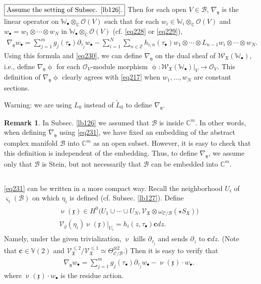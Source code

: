 \documentclass[11pt,b5paper,notitlepage]{article}
\theoremstyle{definition}
\newtheorem{rem}[df]{Remark}
\theoremstyle{plain}
\newcommand{\fk}{\mathfrak}
\newcommand{\mc}{\mathcal}
\newcommand{\wtd}{\widetilde}
\newcommand{\scr}{\mathscr}
\newcommand{\xk}{\mathfrak x}
\newcommand{\yk}{\mathfrak y}
\newcommand{\sgm}{\varsigma}
\newcommand{\SX}{{S_{\fk X}}}
\newcommand{\blt}{\bullet}
\newcommand{\Vbb}{\mathbb V}
\newcommand{\Wbb}{\mathbb W}
\newcommand{\Cbb}{\mathbb C}
\newcommand{\Zbb}{\mathbb Z}
\newcommand{\cbf}{\mathbf c}
\numberwithin{equation}{section}
\begin{document}
\emph{$\boxed{\text{Assume the setting of Subsec. \ref{lb126}.}}$} Then for each open $V\in\mc B$, $\nabla_\yk$ is the linear operator on $\Wbb_\blt\otimes_\Cbb\scr O(V)$ such that for each $w_i\in\Wbb_i\otimes_\Cbb\scr O(V)$ and $w_\blt=w_1\otimes\cdots\otimes w_N$ in $\Wbb_\blt\otimes_\Cbb\scr O(V)$ (cf. \eqref{eq228} or \eqref{eq229}),
\begin{align}
\nabla_\yk w_\blt=\sum_{j=1}^m  g_j(\tau_\blt)\partial_{\tau_j} w_\blt-\sum_{i=1}^N\sum_{n\in\Zbb}h_{i,n}(\tau_\blt)w_1\otimes\cdots\otimes L_{n-1}w_i\otimes\cdots\otimes w_N.\label{eq231}
\end{align}
Using this formula and \eqref{eq230}, we can define $\nabla_\yk$ on the dual sheaf of $\scr W_{\fk X}(\Wbb_\blt)$, i.e., define $\nabla_\yk\upphi$ for each $\scr O_V$-module morphism $\upphi:\scr W_{\fk X}(\Wbb_\blt)|_V\rightarrow\scr O_V$. This definition of $\nabla_\yk\upphi$ clearly agrees with \eqref{eq217} when $w_1,\dots,w_N$ are constant sections.

Warning: we are using $L_0$ instead of $\wtd L_0$ to define $\nabla_\yk$.

\begin{rem}
In Subsec. \ref{lb126} we assumed that $\mc B$ is inside $\Cbb^m$. In other words, when defining $\nabla_\yk$ using \eqref{eq231}, we have fixed an embedding of the abstract complex manifold $\mc B$ into $\Cbb^m$ as an open subset. However, it is easy to check that this definition is independent of the embedding. Thus, to define $\nabla_\yk$, we assume only that $\mc B$ is Stein, but not necessarily that $\mc B$ can be embedded into $\Cbb^m$.
\end{rem}


\subsection{}

\eqref{eq231} can be written in a more compact way. Recall the neighborhood $U_i$  of $\sgm_i(\mc B)$ on which $\eta_i$ is defined (cf. Subsec. \ref{lb127}). Define
\begin{gather}
\begin{gathered}
\upnu(\xk)\in H^0\big(U_1\cup\cdots\cup U_N,\scr V_{\fk X}\otimes\omega_{\mc C/\mc B}(\star\SX)\big)\\
\mc V_\varrho(\eta_i)\upnu(\xk)|_{U_i}=h_i(z,\tau_\blt)\cbf dz.
\end{gathered}
\end{gather}
Namely, under the given trivialization, $\upnu$ kills $\partial_{\tau_j}$ and sends $\partial_z$ to $\cbf dz$. (Note that $\cbf\in\Vbb(2)$ and $\scr V^{\leq 2}_{\fk X}/\scr V^{\leq 1}_{\fk X}\simeq\Theta_{\mc C/\mc B}^{\otimes 2}$.) Then it is easy to verify that
\begin{align}
\nabla_\yk w_\blt=\sum_{j=1}^m  g_j(\tau_\blt)\partial_{\tau_j} w_\blt-\upnu(\xk)\cdot w_\blt.\label{eq232}
\end{align}
where $\upnu(\xk)\cdot w_\blt$ is the residue action.
\end{document}
